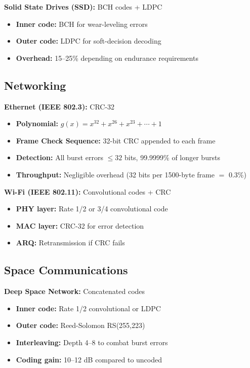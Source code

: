 \textbf{Solid State Drives (SSD):} BCH codes + LDPC
\begin{itemize}
\item \textbf{Inner code:} BCH for wear-leveling errors
\item \textbf{Outer code:} LDPC for soft-decision decoding
\item \textbf{Overhead:} 15--25\% depending on endurance requirements
\end{itemize}

\subsection{Networking}

\textbf{Ethernet (IEEE 802.3):} CRC-32
\begin{itemize}
\item \textbf{Polynomial:} $g(x) = x^{32} + x^{26} + x^{23} + \cdots + 1$
\item \textbf{Frame Check Sequence:} 32-bit CRC appended to each frame
\item \textbf{Detection:} All burst errors $\leq 32$ bits, 99.9999\% of longer bursts
\item \textbf{Throughput:} Negligible overhead (32 bits per 1500-byte frame $=$ 0.3\%)
\end{itemize}

\textbf{Wi-Fi (IEEE 802.11):} Convolutional codes + CRC
\begin{itemize}
\item \textbf{PHY layer:} Rate 1/2 or 3/4 convolutional code
\item \textbf{MAC layer:} CRC-32 for error detection
\item \textbf{ARQ:} Retransmission if CRC fails
\end{itemize}

\subsection{Space Communications}

\textbf{Deep Space Network:} Concatenated codes
\begin{itemize}
\item \textbf{Inner code:} Rate 1/2 convolutional or LDPC
\item \textbf{Outer code:} Reed-Solomon RS(255,223)
\item \textbf{Interleaving:} Depth 4--8 to combat burst errors
\item \textbf{Coding gain:} 10--12 dB compared to uncoded
\end{itemize}

